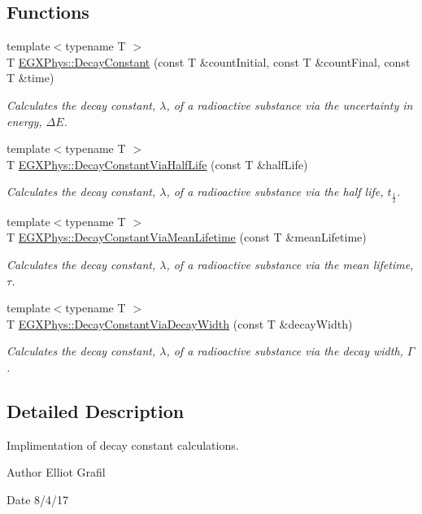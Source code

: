 \subsection*{Functions}
\begin{DoxyCompactItemize}
\item 
{\footnotesize template$<$typename T $>$ }\\T \mbox{\hyperlink{group___e_g_x_phys-_decay_constant_ga904edce5aad441b4a0873b3b1a83c7f2}{E\+G\+X\+Phys\+::\+Decay\+Constant}} (const T \&count\+Initial, const T \&count\+Final, const T \&time)
\begin{DoxyCompactList}\small\item\em Calculates the decay constant, $\lambda$, of a radioactive substance via the uncertainty in energy, $\Delta E$. \end{DoxyCompactList}\item 
{\footnotesize template$<$typename T $>$ }\\T \mbox{\hyperlink{group___e_g_x_phys-_decay_constant_ga89c04a655d9e24f976399cc8f173b7aa}{E\+G\+X\+Phys\+::\+Decay\+Constant\+Via\+Half\+Life}} (const T \&half\+Life)
\begin{DoxyCompactList}\small\item\em Calculates the decay constant, $\lambda$, of a radioactive substance via the half life, $t_{\frac{1}{2}}$. \end{DoxyCompactList}\item 
{\footnotesize template$<$typename T $>$ }\\T \mbox{\hyperlink{group___e_g_x_phys-_decay_constant_ga260cf6dc4f926269ea8966c19dfd269f}{E\+G\+X\+Phys\+::\+Decay\+Constant\+Via\+Mean\+Lifetime}} (const T \&mean\+Lifetime)
\begin{DoxyCompactList}\small\item\em Calculates the decay constant, $\lambda$, of a radioactive substance via the mean lifetime, $\tau$. \end{DoxyCompactList}\item 
{\footnotesize template$<$typename T $>$ }\\T \mbox{\hyperlink{group___e_g_x_phys-_decay_constant_gac0dc5d8a75657eaa2e939dd243fe4ba8}{E\+G\+X\+Phys\+::\+Decay\+Constant\+Via\+Decay\+Width}} (const T \&decay\+Width)
\begin{DoxyCompactList}\small\item\em Calculates the decay constant, $\lambda$, of a radioactive substance via the decay width, $\Gamma$. \end{DoxyCompactList}\end{DoxyCompactItemize}


\subsection{Detailed Description}
Implimentation of decay constant calculations. 

\begin{DoxyAuthor}{Author}
Elliot Grafil 
\end{DoxyAuthor}
\begin{DoxyDate}{Date}
8/4/17 
\end{DoxyDate}
